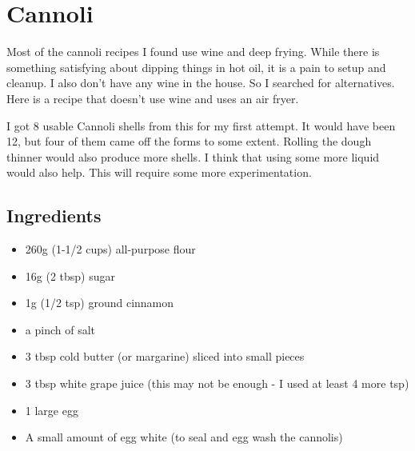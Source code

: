 \documentclass[10pt, openany]{book}
\begin{document}
\section{Cannoli}
Most of the cannoli recipes I found use wine and deep frying.  While there is something satisfying about dipping things in hot oil, it is a pain to setup and cleanup.  I also don't have any wine in the house.  So I searched for alternatives.  Here is a recipe that doesn't use wine and uses an air fryer.

I got 8 usable Cannoli shells from this for my first attempt.  It would have been 12, but four of them came off the forms to some extent.  Rolling the dough thinner would also produce more shells.  I think that using some more liquid would also help.  This will require some more experimentation.

\subsection{Ingredients}
\begin{itemize}
  \item 260g (1-1/2 cups) all-purpose flour
  \item 16g (2 tbsp) sugar
  \item 1g (1/2 tsp) ground cinnamon
  \item a pinch of salt
  \item 3 tbsp cold butter (or margarine) sliced into small pieces
  \item 3 tbsp white grape juice (this may not be enough - I used at least 4 more tsp)
  \item 1 large egg
  \item A small amount of egg white (to seal and egg wash the cannolis)
\end{itemize}
\end{document}
